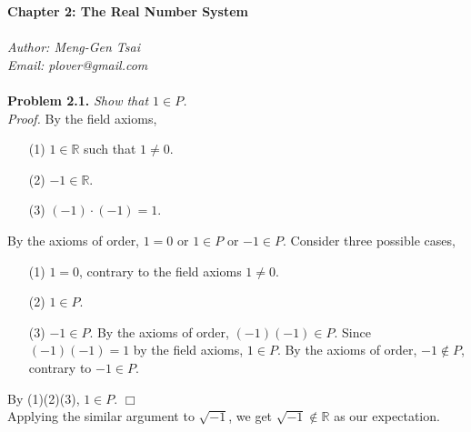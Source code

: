 \documentclass{article}
\begin{document}
\textbf{\Large Chapter 2: The Real Number System} \\\\



\emph{Author: Meng-Gen Tsai} \\
\emph{Email: plover@gmail.com} \\\\



\textbf{Problem 2.1.}
\emph{Show that $1 \in P$.} \\

\emph{Proof.}
By the field axioms,
\begin{enumerate}
\item[(1)]
$1 \in \mathbb{R}$ such that $1 \neq 0$.
\item[(2)]
$-1 \in \mathbb{R}$.
\item[(3)]
$(-1) \cdot (-1) = 1$.
\end{enumerate}

By the axioms of order,
$1 = 0$ or $1 \in P$ or $-1 \in P$.
Consider three possible cases,
\begin{enumerate}
\item[(1)]
$1 = 0$, contrary to the field axioms $1 \neq 0$.
\item[(2)]
$1 \in P$.
\item[(3)]
$-1 \in P$.
By the axioms of order, $(-1)(-1) \in P$.
Since $(-1)(-1) = 1$ by the field axioms, $1 \in P$.
By the axioms of order, $-1 \not\in P$, contrary to $-1 \in P$.
\end{enumerate}
By (1)(2)(3), $1 \in P$.
$\Box$ \\

Applying the similar argument to $\sqrt{-1}$,
we get $\sqrt{-1} \not\in \mathbb{R}$
as our expectation. \\\\
\end{document}
